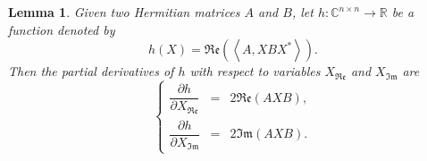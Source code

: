\documentclass[sn-mathphys-num]{sn-jnl}%
\newtheorem{lemma}{Lemma}[section]
\newcommand{\inner}[1]{\left<#1\right>}
\theoremstyle{thmstyleone}%
\theoremstyle{thmstyletwo}%
\theoremstyle{thmstylethree}%
\begin{document}
\begin{lemma}\label{lemma:derivative}
 Given two Hermitian matrices $A$  and $B$, let $h:\mathbb{C}^{n\times n} \rightarrow \mathbb{R}$ be a function denoted by
\begin{equation*}
 h(X) = \mathfrak{Re}(\inner{A, XBX^*}).
\end{equation*}
Then the partial derivatives of $h$ with respect to variables $X_{\mathfrak{Re}}$ and $X_{\mathfrak{Im}}$  are  
\begin{equation}
\left\{ \begin{array}{rcl}
  \dfrac{\partial h}{\partial X_{\mathfrak{Re}}} &=& 
  2 \mathfrak{Re}(AXB),\\[0.3cm]
        \dfrac{\partial h}{\partial X_{\mathfrak{Im}}} &=& 
        2 \mathfrak{Im}(AXB).
\end{array} \right. 
 \label{eq:gradient_h}
\end{equation} 
\end{lemma}
%
\end{document}
